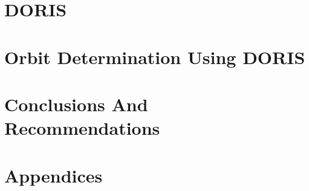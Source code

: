 \documentclass[12pt,a4paper,twoside]{report}
\begin{document}
\chapter{DORIS}\label{ch:doris}
  
  
  
  
  
  
  
\chapter{Orbit Determination Using DORIS}\label{ch:pod-using-doris}
  
  
  
  
  
  

\chapter{Conclusions And Recommendations}\label{ch:summary-and-recomend}
  
  


\iffalse
  
  
  
  
  
  
  
  
  
  
  
  
  
\fi

\clearpage
\appendix
\chapter*{Appendices}
\renewcommand{\thesection}{\Alph{section}}


% 
%
\printbibliography

\end{document}
